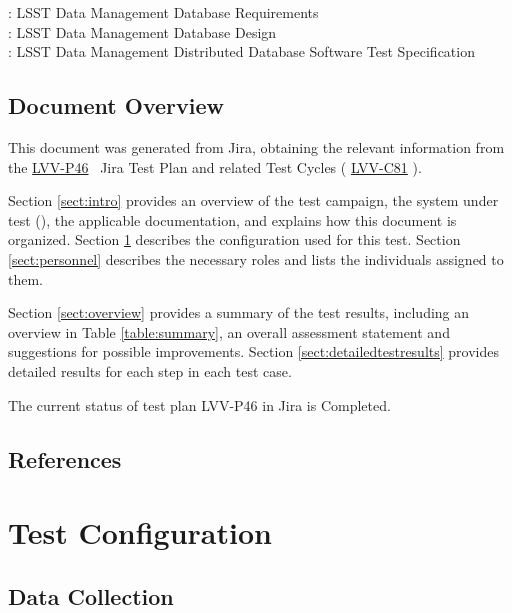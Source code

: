 \documentclass[DM,lsstdraft,STR,toc]{lsstdoc}
\begin{document}
: LSST Data Management Database Requirements\\
: LSST Data Management Database Design\\
: LSST Data Management Distributed Database Software Test
Specification


\subsection{Document Overview}
\label{sect:docoverview}

This document was generated from Jira, obtaining the relevant information from the 
\href{https://jira.lsstcorp.org/secure/Tests.jspa#/testPlan/LVV-P46}{LVV-P46}
~Jira Test Plan and related Test Cycles (
  \href{https://jira.lsstcorp.org/secure/Tests.jspa#/testCycle/LVV-C81}{LVV-C81}
).

Section \ref{sect:intro} provides an overview of the test campaign, the system under test (\product{}), the applicable documentation, and explains how this document is organized.
Section \ref{sect:configuration}  describes the configuration used for this test.
Section \ref{sect:personnel} describes the necessary roles and lists the individuals assigned to them.

Section \ref{sect:overview} provides a summary of the test results, including an overview in Table \ref{table:summary}, an overall assessment statement and suggestions for possible improvements.
Section \ref{sect:detailedtestresults} provides detailed results for each step in each test case.

The current status of test plan LVV-P46 in Jira is Completed.

\subsection{References}
\label{sect:references}
\renewcommand{\refname}{}

\section{Test Configuration}
\label{sect:configuration}

\subsection{Data Collection}
\end{document}
